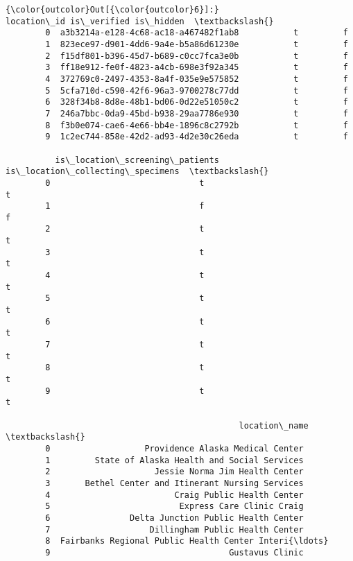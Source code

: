 \documentclass[11pt]{article}
\begin{document}
\begin{Verbatim}[commandchars=\\\{\}]
{\color{outcolor}Out[{\color{outcolor}6}]:}                             location\_id is\_verified is\_hidden  \textbackslash{}
        0  a3b3214a-e128-4c68-ac18-a467482f1ab8           t         f   
        1  823ece97-d901-4dd6-9a4e-b5a86d61230e           t         f   
        2  f15df801-b396-45d7-b689-c0cc7fca3e0b           t         f   
        3  ff18e912-fe0f-4823-a4cb-698e3f92a345           t         f   
        4  372769c0-2497-4353-8a4f-035e9e575852           t         f   
        5  5cfa710d-c590-42f6-96a3-9700278c77dd           t         f   
        6  328f34b8-8d8e-48b1-bd06-0d22e51050c2           t         f   
        7  246a7bbc-0da9-45bd-b938-29aa7786e930           t         f   
        8  f3b0e074-cae6-4e66-bb4e-1896c8c2792b           t         f   
        9  1c2ec744-858e-42d2-ad93-4d2e30c26eda           t         f   
        
          is\_location\_screening\_patients is\_location\_collecting\_specimens  \textbackslash{}
        0                              t                                t   
        1                              f                                f   
        2                              t                                t   
        3                              t                                t   
        4                              t                                t   
        5                              t                                t   
        6                              t                                t   
        7                              t                                t   
        8                              t                                t   
        9                              t                                t   
        
                                               location\_name  \textbackslash{}
        0                   Providence Alaska Medical Center   
        1         State of Alaska Health and Social Services   
        2                     Jessie Norma Jim Health Center   
        3       Bethel Center and Itinerant Nursing Services   
        4                         Craig Public Health Center   
        5                          Express Care Clinic Craig   
        6                Delta Junction Public Health Center   
        7                    Dillingham Public Health Center   
        8  Fairbanks Regional Public Health Center Interi{\ldots}   
        9                                    Gustavus Clinic   
        

\end{Verbatim}
\end{document}
